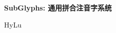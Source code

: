\documentclass[12pt]{article}
\begin{document}

\begin{center}
    {\Huge \textbf{SubGlyphs: 通用拼合注音字系统} \par}
    {\Large HyLu \par}
    \hrulefill
\end{center}






\end{document}
